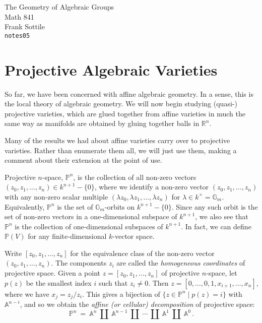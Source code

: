 \documentclass[12pt]{amsart}
\def\silentfootnote#1{{\let\thefootnote\relax\footnotetext{#1}}}
\begin{document}
\begin{center}
\Large
The Geometry of Algebraic Groups\\
\large
Math 841\\
Frank Sottile\\
{\tt notes05}
\end{center}\bigskip

\silentfootnote{\sl Version of 24 February 2000} 

\section{Projective Algebraic Varieties}
So far, we have been concerned with affine algebraic geometry.
In a sense, this is the local theory of algebraic geometry.
We will now begin studying (quasi-) projective varieties, which are glued
together from affine varieties in much the same way as manifolds are
obtained by gluing together balls in ${\mathbb R}^n$.

Many of the results we had about affine varieties carry over to projective
varieties.
Rather than enumerate them all, we will just use them, making a comment
about their extension at the point of use.
\smallskip

Projective $n$-space, ${\mathbb P}^n$, is the collection of all non-zero
vectors $(z_0,z_1,\ldots,z_n)\in k^{n+1}-\{0\}$, where we identify
a non-zero vector $(z_0,z_1,\ldots,z_n)$ with any non-zero scalar multiple 
$(\lambda z_0,\lambda z_1,\ldots,\lambda z_n)$ for 
$\lambda\in k^\times={\mathbb G}_m$.
Equivalently, ${\mathbb P}^n$ is the set of ${\mathbb G}_m$-orbits on
$k^{n+1}-\{0\}$.
Since any such orbit is the set of non-zero vectors in a one-dimensional
subspace of $k^{n+1}$, we also see that ${\mathbb P}^n$ is the collection of
one-dimensional subspaces of $k^{n+1}$.
In fact, we can define ${\mathbb P}(V)$ for any finite-dimensional
$k$-vector space.
\smallskip

Write $[z_0,z_1,\ldots,z_n]$ for the equivalence class of the non-zero
vector $(z_0,z_1,\ldots,z_n)$.
The components $z_i$ are called the {\it homogeneous coordinates} of
projective space.
Given a point $z=[z_0,z_1,\ldots,z_n]$ of projective $n$-space, let $p(z)$
be the smallest index $i$ such that $z_i\neq 0$.
Then $z=[0,\ldots,0,1,x_{i+1},\ldots,x_n]$, where we have $x_j=z_j/z_i$.
This gives a bijection of $\{z\in{\mathbb P}^n\mid p(z)=i\}$ with
${\mathbb A}^{n-i}$, and so we obtain the {\sl affine (or cellular)
decomposition} of projective space:
$$
  {\mathbb P}^n\ =\ {\mathbb A}^n\ {\textstyle \coprod}\ 
  {\mathbb A}^{n-1}\ {\textstyle \coprod}\ \cdots\ {\textstyle \coprod}\ 
  {\mathbb A}^1\ {\textstyle \coprod}\   {\mathbb A}^0\,.
$$
\end{document}

